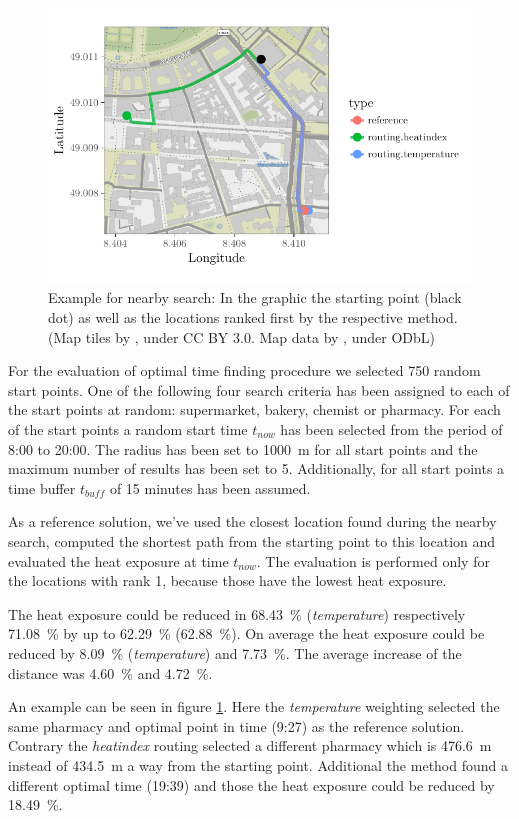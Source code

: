 \begin{figure}
	\centering
	\includegraphics[scale=0.9]{figures/optimaltime_route_example}
	\caption{Example for nearby search: In the graphic the starting point (black dot) as well as the locations ranked first by the respective method. (Map tiles by \textcite{Stamen2017}, under CC BY 3.0. Map data by \textcite{OSMF2016}, under ODbL)}
	\label{fig:optimaltime-route-example}
\end{figure}

For the evaluation of optimal time finding procedure we selected 750 random start points. One of the following four search criteria has been assigned to each of the start points at random: supermarket, bakery, chemist or pharmacy. For each of the start points a random start time $t_{now}$ has been selected from the period of 8:00 to 20:00. The radius has been set to \SI{1000}{\meter} for all start points and the maximum number of results has been set to 5. Additionally, for all start points a time buffer $t_{buff}$ of 15 minutes has been assumed. 

As a reference solution, we've used the closest location found during the nearby search, computed the shortest path from the starting point to this location and evaluated the heat exposure at time $t_{now}$. The evaluation is performed only for the locations with rank 1, because those have the lowest heat exposure.

The heat exposure could be reduced in \SI{68.43}{\percent} (\emph{temperature}) respectively \SI{71.08}{\percent} by up to \SI{62.29}{\percent} (\SI{62.88}{\percent}). On average the heat exposure could be reduced by \SI{8.09}{\percent} (\emph{temperature}) and \SI{7.73}{\percent}. The average increase of the distance was \SI{4.60}{\percent} and \SI{4.72}{\percent}.

An example can be seen in figure \ref{fig:optimaltime-route-example}. 
Here the \emph{temperature} weighting selected the same pharmacy and optimal point in time (9:27) as the reference solution. Contrary the \emph{heatindex} routing selected a different pharmacy which is \SI{476.6}{\meter} instead of  \SI{434.5}{\meter} a way from the starting point. Additional the method found a different optimal time (19:39) and those the heat exposure could be reduced by \SI{18.49}{\percent}.  
 
